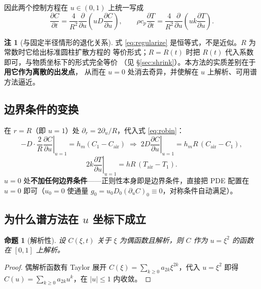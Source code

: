 \documentclass[11pt,a4paper]{article}
\newtheorem{proposition}{命题}
\theoremstyle{definition}
\newtheorem{remark}{注}
\begin{document}
因此两个控制方程在 $u\in(0,1)$ 上统一写成
\begin{equation}
\boxed{\;
\frac{\partial C}{\partial t}=\frac{4}{R^2}\frac{\partial}{\partial u}\!\left(uD\frac{\partial C}{\partial u}\right),
\qquad
\rho c_p\frac{\partial T}{\partial t}=\frac{4}{R^2}\frac{\partial}{\partial u}\!\left(uk\frac{\partial T}{\partial u}\right).
\;}
\label{eq:gov_u}
\end{equation}

\begin{remark}[与固定半径情形的退化关系]
式 \eqref{eq:regularize} 是恒等式，不是近似。$R$ 为常数时它给出标准圆柱扩散方程的
等价形式；$R=R(t)$ 时把 $R(t)$ 代入系数即可，与物质坐标下的形式完全等价
（见 \S\ref{sec:shrink}）。本方法的实质差别在于\textbf{用它作为离散的出发点}，
从而在 $u=0$ 处消去奇异，并使解在 $u$ 上解析、可用谱方法逼近。
\end{remark}

\subsection{边界条件的变换}

在 $r=R$（即 $u=1$）处 $\partial_r=2\partial_u/R$，代入式 \eqref{eq:robin}：
\begin{equation}
-D\cdot\frac{2}{R}\left.\frac{\partial C}{\partial u}\right|_{u=1}=h_m(C_1-C_{\mathrm{air}})
\;\Longrightarrow\;
2D\left.\frac{\partial C}{\partial u}\right|_{u=1}=h_mR\,(C_{\mathrm{air}}-C_1),
\label{eq:bcC_u}
\end{equation}
\begin{equation}
2k\left.\frac{\partial T}{\partial u}\right|_{u=1}=hR\,(T_{\mathrm{air}}-T_1).
\label{eq:bcT_u}
\end{equation}
$u=0$ 处\textbf{不加任何边界条件}——正则性本身即是边界条件，直接把 PDE 配置在
$u=0$ 即可（$u_0=0$ 使通量 $g_0=u_0D_0(\partial_uC)_0\equiv0$，对称条件自动满足）。

\subsection{为什么谱方法在 $u$ 坐标下成立}

\begin{proposition}[解析性]
设 $C(\xi,t)$ 关于 $\xi$ 为偶函数且解析，则 $C$ 作为 $u=\xi^2$ 的函数在 $[0,1]$ 上解析。
\end{proposition}
\begin{proof}
偶解析函数有 Taylor 展开 $C(\xi)=\sum_{k\ge0}a_{2k}\xi^{2k}$，代入 $u=\xi^2$ 即得
$C(u)=\sum_{k\ge0}a_{2k}u^{k}$，在 $|u|\le1$ 内收敛。
\end{proof}
\end{document}
